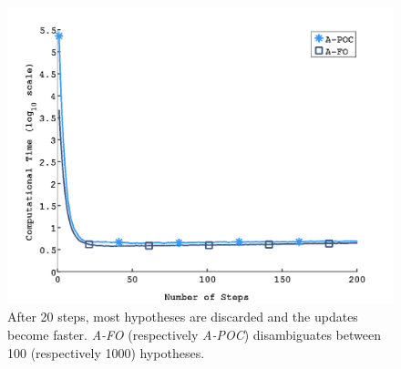 \begin{figure}[htbp!]
  \centering
  \includegraphics[trim=2.6cm 0.4cm 2.7cm 1.8cm, clip=true, width=0.8\columnwidth]{plots/with_noise/computationalTime.png}
  \caption{After 20 steps, most hypotheses are discarded and the updates become faster. \emph{A-FO} (respectively \emph{A-POC}) disambiguates between 100 (respectively 1000) hypotheses.}
  \label{fig:comptime}
\end{figure}



